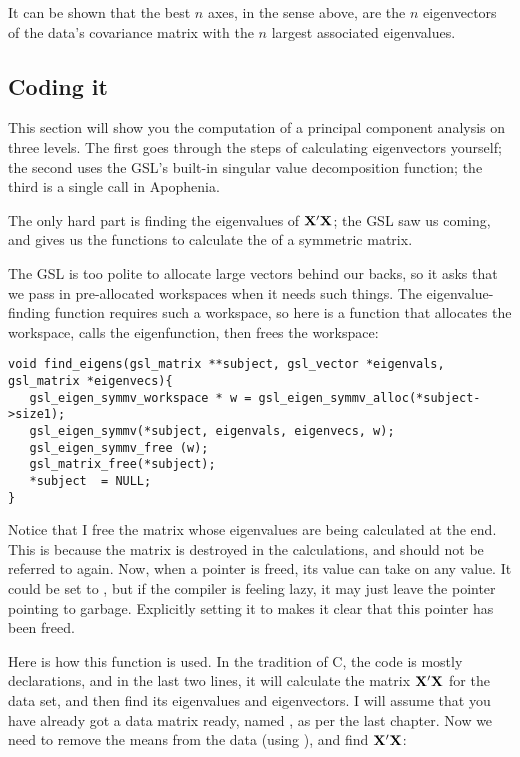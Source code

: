 It can be shown that the best $n$ axes, in the sense above, are the
$n$ eigenvectors of the data's covariance matrix with the $n$ largest
associated eigenvalues.

\subsection{Coding it}
This section will show you the computation of a principal component
analysis on three levels. The first goes through the steps of
calculating eigenvectors yourself; the second uses the 
GSL's built-in singular value decomposition function; the third is a
single call in Apophenia.

The only hard part is finding the eigenvalues of
${\bf X}'{\bf X}$; the GSL saw us coming, and gives us the  functions
to calculate the  of a symmetric matrix.

The GSL is too polite to allocate large vectors behind our backs, so
it asks that we pass in pre-allocated workspaces when it needs such
things. The eigenvalue-finding function requires such a workspace, so
here is a function that allocates the workspace, calls the eigenfunction,
then frees the workspace:
\begin{lstlisting}
void find_eigens(gsl_matrix **subject, gsl_vector *eigenvals, gsl_matrix *eigenvecs){
   gsl_eigen_symmv_workspace * w = gsl_eigen_symmv_alloc(*subject->size1);
   gsl_eigen_symmv(*subject, eigenvals, eigenvecs, w);
   gsl_eigen_symmv_free (w);
   gsl_matrix_free(*subject);
   *subject  = NULL;
}
\end{lstlisting}

Notice that I free the matrix whose eigenvalues are being calculated at
the end.  This is because the matrix is destroyed in the calculations,
and should not be referred to again. Now, when a pointer is freed, its value
can take on any value. It could be set to , but if the compiler
is feeling lazy, it may just leave the pointer pointing to garbage.
Explicitly setting it to  makes it clear that this pointer has
been freed.

Here is how this function is used. In the tradition of C, the code is
mostly declarations, and in the last two lines, it will calculate the
matrix ${\bf X}'{\bf X}$ for the data set, and then find its eigenvalues
and eigenvectors.  
I will assume that you have already got a data matrix ready, named
, as per the last chapter. Now we need to remove the means
from the data (using ), and find ${\bf X}'{\bf X}$:

